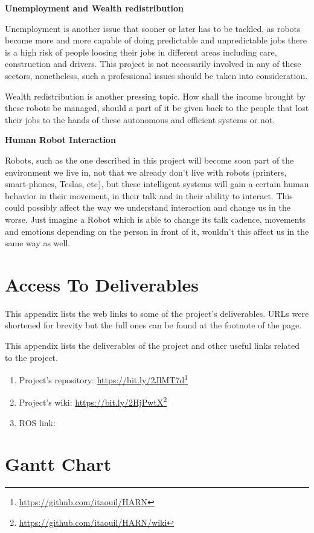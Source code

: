 \begin{appendices}
\textbf{Unemployment and Wealth redistribution}

Unemployment is another issue that sooner or later has to be tackled, as robots become more and more capable of doing predictable and unpredictable jobs there is a high risk of people loosing their jobs in different areas including care, construction and drivers. This project is not necessarily involved in any of these sectors, nonetheless, such a professional issues should be taken into consideration. 

Wealth redistribution is another pressing topic. How shall the income brought by these robots be managed, should a part of it be given back to the people that lost their jobs to the hands of these autonomous and efficient systems or not.

\textbf{Human Robot Interaction}

Robots, such as the one described in this project will become soon part of the environment we live in, not that we already don't live with robots (printers, smart-phones, Teslas, etc), but these intelligent systems will gain a certain human behavior in their movement, in their talk and in their ability to interact. This could possibly affect the way we understand interaction and change us in the worse. Just imagine a Robot which is able to change its talk cadence, movements and emotions depending on the person in front of it, wouldn't this affect us in the same way as well.

\chapter{Access To Deliverables}

This appendix lists the web links to some of the project's deliverables. URLs were shortened for brevity but the full ones can be found at the footnote of the page.

This appendix lists the deliverables of the project and other useful links related to the project.

\begin{enumerate}
  \item Project's repository: \url{https://bit.ly/2JlMT7d}\footnote{\url{https://github.com/itaouil/HARN}}
  \item Project's wiki: \url{https://bit.ly/2HjPwtX}\footnote{\url{https://github.com/itaouil/HARN/wiki}}
  \item ROS link: 
\end{enumerate}

\chapter{Gantt Chart}


\end{appendices}
